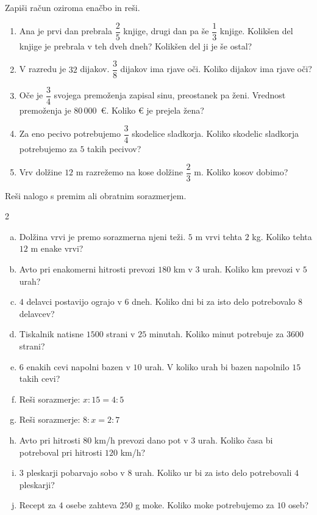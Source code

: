 \documentclass[a4paper,12pt]{letter}
\begin{document}
\begin{naloga}
Zapi\v{s}i ra\v{c}un oziroma ena\v{c}bo in reši.

\begin{enumerate}[1.)]
\item Ana je prvi dan prebrala $\dfrac{2}{5}$ knjige, drugi dan pa \v{s}e $\dfrac{1}{3}$ knjige.
Kolik\v{s}en del knjige je prebrala v teh dveh dneh? Kolik\v{s}en del ji je \v{s}e ostal?
\item V razredu je $32$ dijakov. $\dfrac{3}{8}$ dijakov ima rjave o\v{c}i. Koliko dijakov ima rjave o\v{c}i?
\item O\v{c}e je $\dfrac{3}{4}$ svojega premo\v{z}enja zapisal sinu, preostanek pa \v{z}eni.
Vrednost premo\v{z}enja je $80\,000$~\euro{}. Koliko \euro{} je prejela \v{z}ena?
\item Za eno pecivo potrebujemo $\dfrac{3}{4}$ skodelice sladkorja. Koliko skodelic sladkorja
potrebujemo za $5$ takih pecivov?
\item Vrv dol\v{z}ine $12$ m razre\v{z}emo na kose dol\v{z}ine $\dfrac{2}{3}$ m. Koliko kosov dobimo?
\end{enumerate}
\end{naloga}

\begin{naloga}
Re\v{s}i nalogo s premim ali obratnim sorazmerjem.

\begin{multicols}{2}
\begin{enumerate}[a.)]
\item Dol\v{z}ina vrvi je premo sorazmerna njeni te\v{z}i. $5$ m vrvi tehta $2$ kg. Koliko tehta $12$ m enake vrvi?
\item Avto pri enakomerni hitrosti prevozi $180$ km v $3$ urah. Koliko km prevozi v $5$ urah?
\item $4$ delavci postavijo ograjo v $6$ dneh. Koliko dni bi za isto delo potrebovalo $8$ delavcev?
\item Tiskalnik natisne $1500$ strani v $25$ minutah. Koliko minut potrebuje za $3600$ strani?
\item $6$ enakih cevi napolni bazen v $10$ urah. V koliko urah bi bazen napolnilo $15$ takih cevi?
\item Re\v{s}i sorazmerje: $x:15=4:5$
\item Re\v{s}i sorazmerje: $8:x=2:7$
\item Avto pri hitrosti $80$ km/h prevozi dano pot v $3$ urah. Koliko \v{c}asa bi potreboval pri hitrosti $120$ km/h?
\item $3$ pleskarji pobarvajo sobo v $8$ urah. Koliko ur bi za isto delo potrebovali $4$ pleskarji?
\item Recept za $4$ osebe zahteva $250$ g moke. Koliko moke potrebujemo za $10$ oseb?
\end{enumerate}
\end{multicols}
\end{naloga}
\end{document}
